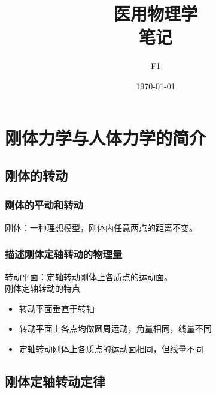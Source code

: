 \documentclass[12pt, a4paper, oneside]{ctexbook}
\title{{\Huge{\textbf{医用物理学}}}\\笔记}
\author{F1}
\date{\today}
\begin{document}
\maketitle

\setcounter{page}{1}



{}
\setcounter{page}{1}
\tableofcontents
\newpage
\setcounter{page}{1}

\chapter{刚体力学与人体力学的简介}
\section{刚体的转动}
\subsection{刚体的平动和转动}
刚体：一种理想模型，刚体内任意两点的距离不变。

\subsection{描述刚体定轴转动的物理量}
转动平面：定轴转动刚体上各质点的运动面。\\
刚体定轴转动的特点
\begin{itemize}
    \item 转动平面垂直于转轴
    \item 转动平面上各点均做圆周运动，角量相同，线量不同
    \item 定轴转动刚体上各质点的运动面相同，但线量不同
\end{itemize}

\section{刚体定轴转动定律}
\end{document}
